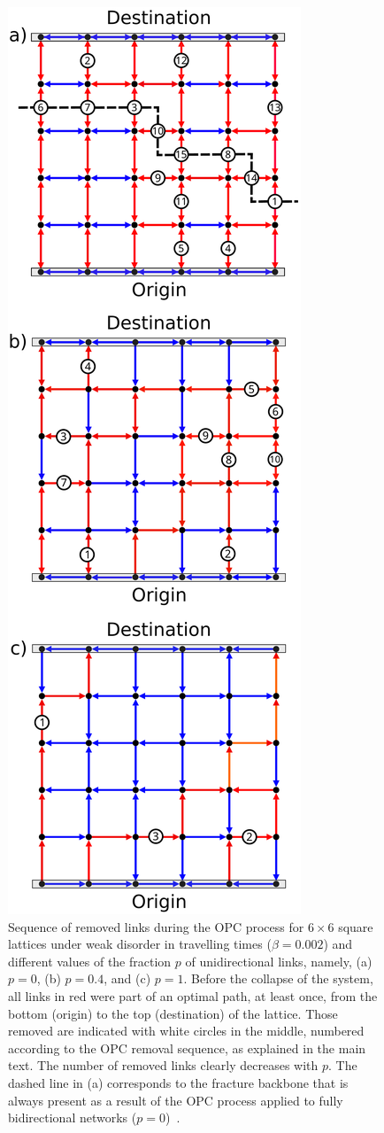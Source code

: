 \documentclass[aps,prl,twocolumn,showpacs,
superscriptaddress,floatfix, 10pt]{revtex4-1}
\begin{document}
\begin{figure}[ht]
	\centering
	\includegraphics[width=0.57\columnwidth]{fig1} 
	\caption{Sequence of removed links during the OPC process for $6\times 6$
	square lattices under weak disorder in travelling times ($\beta=0.002$) and
	different values of the fraction $p$ of unidirectional links, namely, (a)
	$p=0$, (b) $p=0.4$, and (c) $p=1$. Before the collapse of the system, all links
	in red were part of an optimal path, at least once, from the bottom (origin) to
	the top (destination) of the lattice. Those removed are indicated with white
	circles in the middle, numbered according to the OPC removal sequence, as
	explained in the main text. The number of removed links clearly decreases with
	$p$. The dashed line in (a) corresponds to the fracture backbone that is always
	present as a result of the OPC process applied to fully bidirectional networks
	($p=0$)~\cite{Andrade2009}. ~\label{fig::spatial.distribution}}
\end{figure}
	
\end{document}
